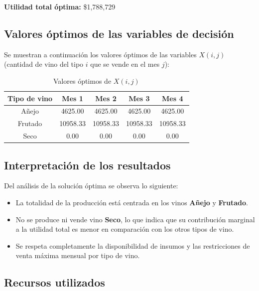 \documentclass[12pt, a4paper, oneside]{book}
\theoremstyle{definition}
\begin{document}
\begin{center}
\textbf{Utilidad total óptima:} \$1,788,729
\end{center}

\subsection{Valores óptimos de las variables de decisión}

Se muestran a continuación los valores óptimos de las variables $X(i,j)$ (cantidad de vino del tipo $i$ que se vende en el mes $j$):

\begin{table}
\centering
\caption{Valores óptimos de $X(i,j)$}
\begin{tabular}{|c|c|c|c|c|}
\hline
\textbf{Tipo de vino} & \textbf{Mes 1} & \textbf{Mes 2} & \textbf{Mes 3} & \textbf{Mes 4} \\
\hline
Añejo   & 4625.00 & 4625.00 & 4625.00 & 4625.00 \\
Frutado & 10958.33 & 10958.33 & 10958.33 & 10958.33 \\
Seco    & 0.00    & 0.00    & 0.00    & 0.00 \\
\hline
\end{tabular}
\end{table}

\subsection{Interpretación de los resultados}

Del análisis de la solución óptima se observa lo siguiente:

\begin{itemize}
    \item La totalidad de la producción está centrada en los vinos \textbf{Añejo} y \textbf{Frutado}.
    \item No se produce ni vende vino \textbf{Seco}, lo que indica que su contribución marginal a la utilidad total es menor en comparación con los otros tipos de vino.
    \item Se respeta completamente la disponibilidad de insumos y las restricciones de venta máxima mensual por tipo de vino.
\end{itemize}

\subsection{Recursos utilizados}
\end{document}
